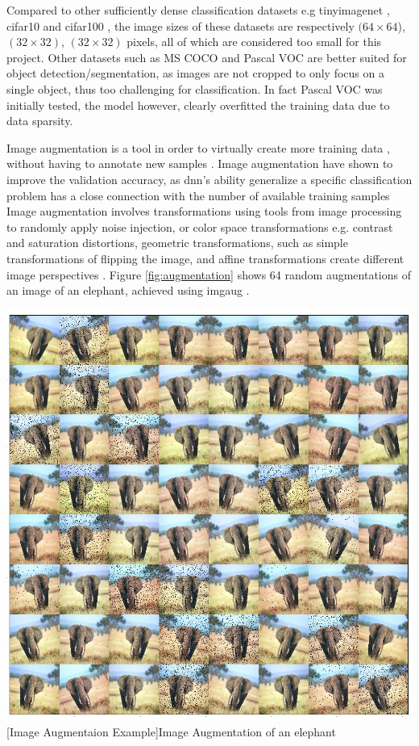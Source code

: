 \begin{enumdescript}
\begin{enumdescript}
		Compared to other sufficiently dense classification datasets e.g \gls{tinyimagenet} \cite{li_cs231n:_2018}, \gls{cifar10} and \gls{cifar100} \cite{krizhevsky_cifar-10_nodate}, the image sizes of these datasets are respectively $(64\times 64$), $(32\times 32)$, $(32\times 32)$ pixels, all of which are considered too small for this project. Other datasets such as MS COCO and Pascal VOC are better suited for object detection/segmentation, as images are not cropped to only focus on a single object, thus too challenging for classification. In fact Pascal VOC was initially tested, the model however, clearly overfitted the training data due to data sparsity. 
		
		\item[Image Augmentation] Image augmentation is a tool in order to virtually create more training data \cite{perez_effectiveness_2017}, without having to annotate new samples \cite{goodfellow_deep_2016}. Image augmentation have shown to improve the validation accuracy, as \gls{dnn}'s ability generalize a specific classification problem has a close connection with the number of available training samples
		Image augmentation involves transformations using tools from image processing to randomly apply noise injection, or color space transformations e.g. contrast and saturation distortions, geometric transformations, such as simple transformations of flipping the image, and affine transformations create different image perspectives \cite{shorten_survey_2019}. Figure \ref{fig:augmentation} shows 64 random augmentations of an image of an elephant, achieved using \gls{imgaug} \cite{jung_imgaug:_nodate}.  
		
		\begin{minipage}[t]{\linewidth}
			\centering
			\includegraphics[width=.7\linewidth]{figures/augmentation/augmentation_high_resolution.png}
			[Image Augmentaion Example]{Image Augmentation of an elephant}
			\label{fig:augmentation}
		\end{minipage}
		

\end{enumdescript}
\end{enumdescript}
